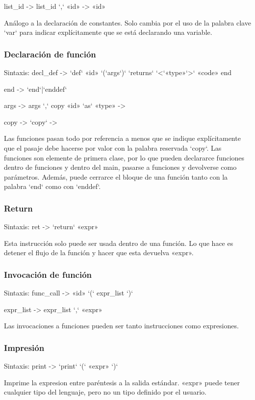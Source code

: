 \documentclass[12pt, spanish]{report}
\begin{document}
  list_id  -> list_id `,` «id»
           -> «id»

Análogo a la declaración de constantes. Solo cambia por el uso de
la palabra clave `var` para indicar explícitamente que se está
declarando una variable.

\subsubsection{Declaraci\'on de funci\'on}
Sintaxis:
  decl_def -> `def` «id» `(`args`)` `returns` `<`«type»`>` «code» end

  end      -> `end`|`enddef`

  args     -> args `,` copy «id» `as` «type»
           -> 
   
  copy     -> `copy`
           ->

Las funciones pasan todo por referencia a menos que se indique
explícitamente que el pasaje debe hacerse por valor con la palabra
reservada `copy`. Las funciones son elemente de primera clase, por lo
que pueden declararce funciones dentro de funciones y dentro del main,
pasarse a funciones y devolverse como parámetros. Adem\'as, puede cerrarce el bloque de una funci\'on tanto con la palabra `end` como con `enddef`.

\subsubsection{Return}
Sintaxis:
  ret  -> `return` «expr» 

Esta instrucci\'on solo puede ser usada dentro de una funci\'on. Lo que
hace es detener el flujo de la funci\'on y hacer que esta devuelva «expr».

\subsubsection{Invocación de función}
Sintaxis:
  func_call  -> «id» `(` expr_list `)`
  
  expr_list  -> expr_list `,` «expr»

Las invocaciones a funciones pueden ser tanto instrucciones como
expresiones.

\subsubsection{Impresi\'on}
Sintaxis:
  print     -> `print` `(` «expr» `)` 

Imprime la expresion entre par\'entesis a la salida est\'andar. «expr»
puede tener cualquier tipo del lenguaje, pero no un tipo definido por el usuario.
\end{document}
